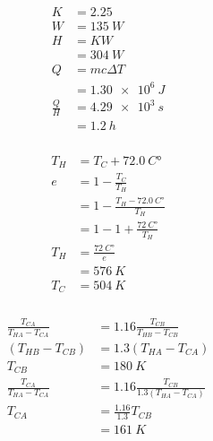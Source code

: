 \documentclass{article}
\begin{document}
\setcounter{subsubsection}{10}
\subsubsection{}

\begin{align*}
  K           & = 2.25            \\
  W           & = \qty{135}{W}    \\
  H           & = K W             \\
              & = \qty{304}{W}    \\
  Q           & = m c \Delta T    \\
              & = \qty{1.30e6}{J} \\
  \frac{Q}{H} & = \qty{4.29e3}{s} \\
              & = \qty{1.2}{h}
\end{align*}

\setcounter{subsubsection}{12}
\subsubsection{}

\begin{align*}
  T_H & = T_C + \qty{72.0}{C \degree}                 \\
  e   & = 1 - \frac{T_C}{T_H}                         \\
      & = 1 - \frac{T_H - \qty{72.0}{C \degree}}{T_H} \\
      & = 1 - 1 + \frac{\qty{72}{C \degree}}{T_H}     \\
  T_H & = \frac{\qty{72}{C \degree}}{e}               \\
      & = \qty{576}{K}                                \\
  T_C & = \qty{504}{K}
\end{align*}

\setcounter{subsubsection}{20}
\subsubsection{}

\begin{align*}
  \frac{T_{CA}}{T_{HA} - T_{CA}} & = 1.16 \frac{T_{CB}}{T_{HB} - T_{CB}}       \\
  (T_{HB} - T_{CB})              & = 1.3 (T_{HA} - T_{CA})                     \\
  T_{CB}                         & = \qty{180}{K}                              \\
  \frac{T_{CA}}{T_{HA} - T_{CA}} & = 1.16 \frac{T_{CB}}{1.3 (T_{HA} - T_{CA})} \\
  T_{CA}                         & = \frac{1.16}{1.3} T_{CB}                   \\
                                 & = \qty{161}{K}
\end{align*}
\end{document}
